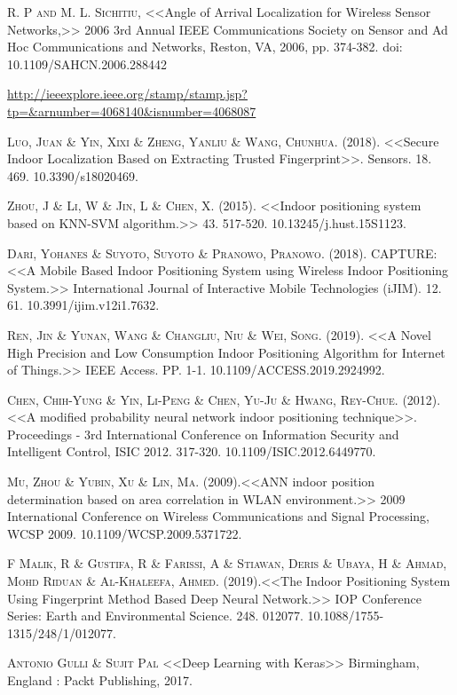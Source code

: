 \documentclass[12pt]{report}
\begin{document}
\begin{thebibliography}{X}
 \textsc{R. P and M. L. Sichitiu}, <<Angle of Arrival Localization for Wireless Sensor Networks,>> 2006 3rd Annual IEEE Communications Society on Sensor and Ad Hoc Communications and Networks, Reston, VA, 2006, pp. 374-382. doi: 10.1109/SAHCN.2006.288442

\url{http://ieeexplore.ieee.org/stamp/stamp.jsp?tp=&arnumber=4068140&isnumber=4068087}

 \textsc{Luo, Juan \& Yin, Xixi \& Zheng, Yanliu \& Wang, Chunhua.} (2018). <<Secure Indoor Localization Based on Extracting Trusted Fingerprint>>. Sensors. 18. 469. 10.3390/s18020469.

 \textsc{Zhou, J \& Li, W \& Jin, L \& Chen, X.} (2015). <<Indoor positioning system based on KNN-SVM algorithm.>> 43. 517-520. 10.13245/j.hust.15S1123.

\textsc{Dari, Yohanes \& Suyoto, Suyoto \& Pranowo, Pranowo.} (2018). CAPTURE: <<A Mobile Based Indoor Positioning System using Wireless Indoor Positioning System.>> International Journal of Interactive Mobile Technologies (iJIM). 12. 61. 10.3991/ijim.v12i1.7632. 

 \textsc{Ren, Jin \& Yunan, Wang \& Changliu, Niu \& Wei, Song}. (2019). <<A Novel High Precision and Low Consumption Indoor Positioning Algorithm for Internet of Things.>> IEEE Access. PP. 1-1. 10.1109/ACCESS.2019.2924992.

\textsc{Chen, Chih-Yung \& Yin, Li-Peng \& Chen, Yu-Ju \& Hwang, Rey-Chue}. (2012). <<A modified probability neural network indoor positioning technique>>. Proceedings - 3rd International Conference on Information Security and Intelligent Control, ISIC 2012. 317-320. 10.1109/ISIC.2012.6449770.

 \textsc{Mu, Zhou \& Yubin, Xu \& Lin, Ma}. (2009).<<ANN indoor position determination based on area correlation in WLAN environment.>> 2009 International Conference on Wireless Communications and Signal Processing, WCSP 2009. 10.1109/WCSP.2009.5371722. 

 \textsc{F Malik, R \& Gustifa, R \& Farissi, A \& Stiawan, Deris \& Ubaya, H \& Ahmad, Mohd Riduan \& Al-Khaleefa, Ahmed. (2019)}.<<The Indoor Positioning System Using Fingerprint Method Based Deep Neural Network.>> IOP Conference Series: Earth and Environmental Science. 248. 012077. 10.1088/1755-1315/248/1/012077. 

 \textsc{Antonio Gulli \& Sujit Pal}
<<Deep Learning with Keras>> Birmingham, England : Packt Publishing, 2017. 
\end{thebibliography}


	\appendix
%	
	
\end{document}
